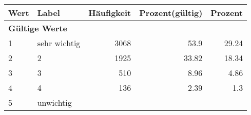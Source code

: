      \begin{longtable}{lXrrr}
     \toprule
     \textbf{Wert} & \textbf{Label} & \textbf{Häufigkeit} & \textbf{Prozent(gültig)} & \textbf{Prozent} \\
     \endhead
     \midrule
     \multicolumn{5}{l}{\textbf{Gültige Werte}}\\

     1 &
     \multicolumn{1}{X}{ sehr wichtig   } &


       \num{3068} &
       \num[round-mode=places,round-precision=2]{53.9} &
         \num[round-mode=places,round-precision=2]{29.24} \\

     2 &
     \multicolumn{1}{X}{ 2   } &


       \num{1925} &
       \num[round-mode=places,round-precision=2]{33.82} &
         \num[round-mode=places,round-precision=2]{18.34} \\

     3 &
     \multicolumn{1}{X}{ 3   } &


       \num{510} &
       \num[round-mode=places,round-precision=2]{8.96} &
         \num[round-mode=places,round-precision=2]{4.86} \\

     4 &
     \multicolumn{1}{X}{ 4   } &


       \num{136} &
       \num[round-mode=places,round-precision=2]{2.39} &
         \num[round-mode=places,round-precision=2]{1.3} \\

     5 &
     \multicolumn{1}{X}{ unwichtig   } &



\end{longtable}
